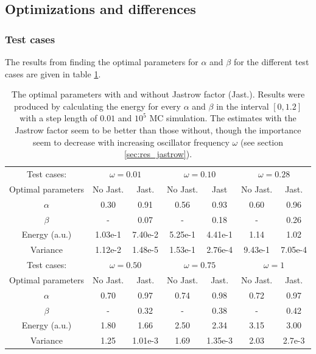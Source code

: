 \subsection{Optimizations and differences} \label{sec:res_opt_and_diff}

\subsubsection{Test cases}

The results from finding the optimal parameters for $\alpha$ and $\beta$ for the different test cases are given in table \ref{tab:test_cases}.

\begin{table}[h!]
	\centering 
	\begin{tabular}{c  c c  c  c  c  c }
	\toprule
	 Test cases: 			& \multicolumn{2}{c}{$\omega=0.01$} & \multicolumn{2}{c}{$\omega=0.10$} & \multicolumn{2}{c}{$\omega=0.28$} \\
	 Optimal parameters  & No Jast. & 	Jast. & 	No Jast. & 	Jast &		No Jast. & 	Jast. \\
	 \midrule
	 $\alpha$& 				0.30 & 		0.91 & 		0.56	&	0.93	&	0.60 & 		0.96 		\\
	 $\beta$ & 				- & 		0.07 & 		-		&	0.18	&	- & 		0.26 	\\
	 \midrule
	 Energy (a.u.) & 		1.03e-1 &	7.40e-2 &	5.25e-1	&	4.41e-1	&	1.14  &		1.02 \\
	 Variance & 			1.12e-2 &	1.48e-5	& 	1.53e-1	&	2.76e-4	&	9.43e-1 & 	7.05e-4 	\\
	\bottomrule
	\toprule
	 Test cases: 			& \multicolumn{2}{c}{$\omega=0.50$} & \multicolumn{2}{c}{$\omega=0.75$} & \multicolumn{2}{c}{$\omega=1$} \\
	 Optimal parameters  & No Jast. & 	Jast. & 	No Jast. & 	Jast. & 	No Jast. & Jast. \\
	 \midrule
	 $\alpha$& 				0.70 & 		0.97 & 		0.74 & 		0.98 	& 	0.72	& 	0.97 	\\
	 $\beta$ & 				- & 		0.32 & 		- & 		0.38 & 		-  		& 	0.42 	\\
	 \midrule
	 Energy (a.u.) & 		1.80 &		1.66 &		2.50  &		2.34 & 		3.15 & 		3.00	\\
	 Variance & 			1.25 &		1.01e-3	& 	1.69 & 		1.35e-3 & 	2.03 & 		2.7e-3 	\\
	 \bottomrule
	\end{tabular}
	\caption{The optimal parameters with and without Jastrow factor (Jast.).
			 Results were produced by calculating the energy for every $\alpha$ and $\beta$ in the interval $[0,1.2]$ with 	a step length of $0.01$ and $10^5$ MC simulation.
			 The estimates with the Jastrow factor seem to be better than those without, though the importance seem to decrease with increasing oscillator frequency $\omega$ (see section \ref{sec:res_jastrow}). }
	\label{tab:test_cases}
\end{table}

